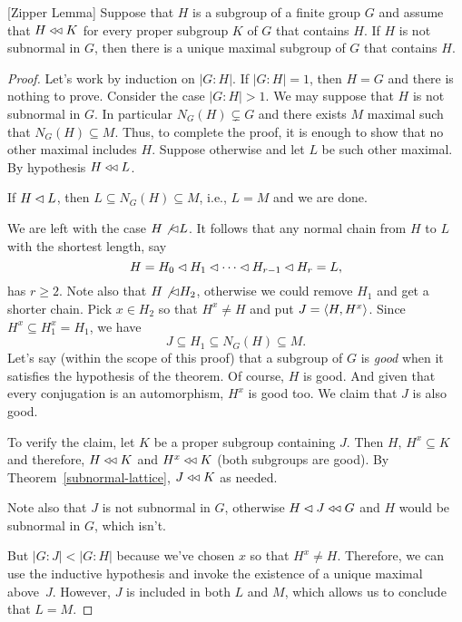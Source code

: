 \begin{thm}\label{zipper-lemma} {\rm[Zipper Lemma]}
    Suppose that\/ $H$ is a subgroup of a finite group\/ $G$ and assume that\/ $H\mathrel{\triangleleft\triangleleft} K$ for every proper subgroup\/ $K$ of\/ $G$ that contains\/ $H$. If\/ $H$ is not subnormal in\/ $G$, then there is a unique maximal subgroup of\/ $G$ that contains\/ $H$.
\end{thm}

\begin{proof} Let's work by induction on $|G:H|$. If $|G:H|=1$, then $H=G$ and there is nothing to prove. Consider the case $|G:H|>1$. We may suppose that $H$ is not subnormal in $G$. In particular $N_G(H)\varsubsetneq G$ and there exists $M$ maximal such that $N_G(H)\subseteq M$. Thus, to complete the proof, it is enough to show that no other maximal includes $H$. Suppose otherwise and let $L$ be such other maximal. By hypothesis $H\mathrel{\triangleleft\triangleleft} L$.

If $H\lhd L$, then $L\subseteq N_G(H)\subseteq M$, i.e., $L=M$ and we are done.

We are left with the case $H\not\lhd L$. It follows that any normal chain from $H$ to $L$ with the shortest length, say
$$
    H = H_0\lhd H_1\lhd\cdots\lhd H_{r-1}\lhd H_r = L,
$$
has $r\ge 2$. Note also that $H\not\lhd H_2$, otherwise we could remove $H_1$ and get a shorter chain. Pick $x\in H_2$ so that $H^x\ne H$ and put $J=\langle H,H^x\rangle$. Since $H^x\subseteq H_1^x = H_1$, we have
$$
    J\subseteq H_1\subseteq N_G(H) \subseteq M.
$$
Let's say (within the scope of this proof) that a subgroup of $G$ is \textsl{good} when it satisfies the hypothesis of the theorem. Of course, $H$ is good. And given that every conjugation is an automorphism, $H^x$ is good too. We claim that $J$ is also good.

To verify the claim, let $K$ be a proper subgroup containing $J$. Then $H,\,H^x\subseteq K$ and therefore, $H\mathrel{\triangleleft\triangleleft} K$ and $H^x\mathrel{\triangleleft\triangleleft} K$ (both subgroups are good). By Theorem~\ref{subnormal-lattice}, $J\mathrel{\triangleleft\triangleleft} K$ as needed.

Note also that $J$ is not subnormal in $G$, otherwise $H\lhd J\mathrel{\triangleleft\triangleleft} G$ and $H$ would be subnormal in $G$, which isn't.

But $|G:J|<|G:H|$ because we've chosen $x$ so that $H^x\ne H$. Therefore, we can use the inductive hypothesis and invoke the existence of a unique maximal above~$J$. However, $J$ is included in both $L$ and $M$, which allows us to conclude that $L=M$.  \end{proof}

